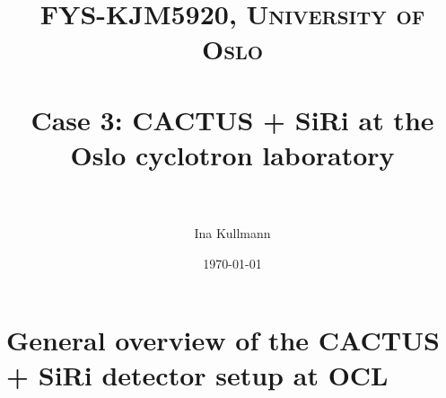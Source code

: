 \documentclass[paper=a4, fontsize=11pt]{scrartcl} %
\title{	
\normalfont \normalsize 
\textsc{FYS-KJM5920, University of Oslo} \\ [25pt] %
\horrule{0.5pt} \\[0.4cm] %
\huge Case 3: CACTUS + SiRi at the Oslo cyclotron laboratory  \\ %
\horrule{2pt} \\[0.5cm] %
}
\author{Ina Kullmann} %
\date{\normalsize\today} %
\begin{document}
\maketitle %










\section{General overview of the CACTUS + SiRi detector setup at OCL}

\end{document}
